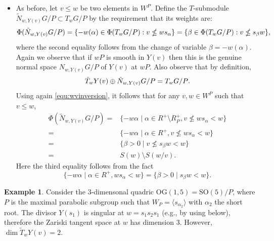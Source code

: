 \documentclass[11pt]{article}
\theoremstyle{definition}
\newtheorem{example}[theo]{Example}
\numberwithin{equation}{section}
\begin{document}
\begin{itemize}
	\item As before, let $v \le w$ be two elements in $W^P$. Define the $T$-submodule 
	$\tilde{N}_{w, Y(v)}G/P \subset T_w G/P$ by the requirement that its weights are:
	\[ \Phi(\tilde{N}_{w,Y(v)} G/P) = \{ -w(\alpha) \in \Phi(T_w G/P): v \nleq w s_\alpha \}=\{ \beta \in \Phi(T_w G/P): v \nleq s_\beta w  \} \/, \]
	where the second equality follows from the change of variable $\beta=-w(\alpha)$.
	Again we observe that if $wP$ is smooth in $Y(v)$ then this is the genuine normal
	space $N_{w, Y(v)}G/P$ of $Y(v)$ at $wP$. Also observe that by definition,
	\[ \tilde{T}_w Y(v) \oplus \tilde{N}_{w,Y(v)} G/P = T_w G/P \/. \]
	Using again \eqref{equ:wvinversion}, it follows that for any $v,w\in W^P$ such that $v\leq w$,
		\begin{align*}
			\Phi(\tilde{N}_{w,Y(v)} G/P)=&\{-w\alpha\mid \alpha\in R^+\setminus R^+_P, v\nleq ws_\alpha<w\}\\
			=&\{-w\alpha\mid \alpha\in R^+, v\nleq ws_\alpha<w\}\\
			=&\{\beta>0\mid v\nleq s_\beta w<w\}\\
			=&S(w)\setminus S(w/v).
		\end{align*}
		Here the third equality follows from the fact
		\[\{-w\alpha\mid \alpha\in R^+,  ws_\alpha<w\}=\{\beta>0\mid s_\beta w<w\}.\]
\end{itemize}
\begin{example}\label{ex:zariski} Consider the $3$-dimensonal quadric 
		$\mathrm{OG}(1,5)=\mathrm{SO}(5)/P$, where
		$P$ is the maximal parabolic subgroup 
		such that $W_{P}= \langle s_{\alpha_2} \rangle$ with $\alpha_2$ the short root.
		The divisor $Y(s_1)$ is singular at $w=s_1 s_2 s_1$ (e.g., by using
		 below), therefore the Zariski tangent
		space at $w$ has dimension $3$. However, $\dim \tilde{T}_w Y(v)=2$.
\end{example}
\end{document}
